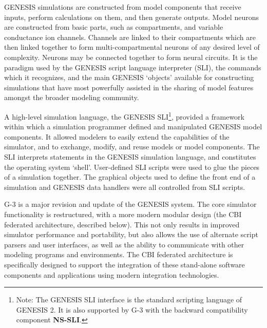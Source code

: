 \documentclass[12pt]{article}
\begin{document}
GENESIS simulations are constructed from model components that receive
inputs, perform calculations on them, and then generate outputs. Model
neurons are constructed from basic parts, such as compartments, and
variable conductance ion channels. Channels are linked to their
compartments which are then linked together to form
multi-compartmental neurons of any desired level of complexity.
Neurons may be connected together to form neural circuits.  It is the
paradigm used by the GENESIS script language interpreter (SLI), the
commands which it recognizes, and the main GENESIS `objects' available
for constructing simulations that have most powerfully assisted in the
sharing of model features amongst the broader modeling community.

A high-level simulation language, the GENESIS SLI\footnote{Note: The
  GENESIS SLI interface is the standard scripting language of GENESIS
  2. It is also supported by G-3 with the backward compatibility
  component {\bf NS-SLI}.}, provided a framework within which a
simulation programmer defined and manipulated GENESIS model
components. It allowed modelers to easily extend the capabilities of
the simulator, and to exchange, modify, and reuse models or model
components. The SLI interprets statements in the
GENESIS simulation language, and constitutes the operating system
`shell'. User-defined SLI scripts were used to glue the pieces of a
simulation together. The graphical objects used to define the front
end of a simulation and GENESIS data handlers were all controlled from
SLI scripts.

G-3 is a major revision and update of the GENESIS system.  The core
simulator functionality is restructured, with a more modern modular
design (the CBI federated architecture, described below). This not
only results in improved simulator performance and portability, but
also allows the use of alternate script parsers and user interfaces,
as well as the ability to communicate with other modeling programs and
environments. The CBI federated architecture is specifically designed
to support the integration of these stand-alone software components
and applications using modern integration technologies.
\end{document}
